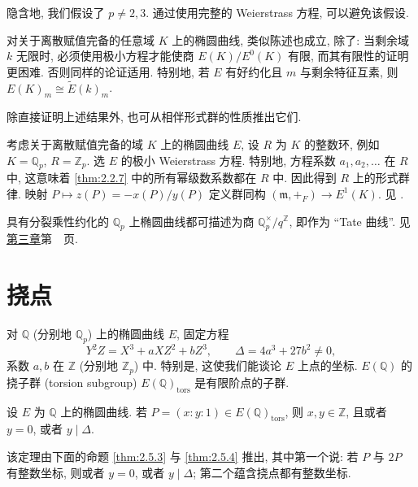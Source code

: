 \begin{remark} \label{thm:2.4.3} 
隐含地, 我们假设了 $p\neq 2,3$. 通过使用完整的 Weierstrass 方程, 可以避免该假设.

对关于离散赋值完备的任意域 $K$ 上的椭圆曲线, 类似陈述也成立, 除了: 当剩余域 $k$ 无限时, 必须使用极小方程才能使商 $E(K)/E^0(K)$ 有限, 而其有限性的证明更困难. 否则同样的论证适用. 特别地, 若 $E$ 有好约化且 $m$ 与剩余特征互素, 则 $E(K)_m\cong\tilde{E}(k)_m$.
\end{remark}

\begin{aside} \label{thm:2.4.4} 
除直接证明上述结果外, 也可从相伴形式群的性质推出它们.

考虑关于离散赋值完备的域 $K$ 上的椭圆曲线 $E$, 设 $R$ 为 $K$ 的整数环, 例如 $K = \mathbb{Q}_p$, $R = \mathbb{Z}_p$. 选 $E$ 的极小 Weierstrass 方程. 特别地, 方程系数 $a_1, a_2, \dots$ 在 $R$ 中, 这意味着 \ref{thm:2.2.7} 中的所有幂级数系数都在 $R$ 中. 因此得到 $R$ 上的形式群律. 映射 $P\mapsto z(P) = -x(P)/y(P)$ 定义群同构 $(\mathfrak{m}, +_F)\to E^1(K)$. 见 \cite[\S6]{tate1974}.
\end{aside}

\begin{aside} \label{thm:2.4.5} 
具有分裂乘性约化的 $\mathbb{Q}_p$ 上椭圆曲线都可描述为商 $\mathbb{Q}_p^{\times}/q^{\mathbb{Z}}$, 即作为 ``Tate 曲线''. 见\hyperref[ch:3]{第三章}第~\pageref{subsec:tate-curves}~页.
\end{aside}

\section{挠点}\label{sec:2.5}

对 $\mathbb{Q}$ (分别地 $\mathbb{Q}_p$) 上的椭圆曲线 $E$, 固定方程
\[
Y^2Z = X^3 + aXZ^2 + bZ^3, \qquad \Delta = 4a^3 + 27b^2\neq 0,
\]
系数 $a,b$ 在 $\mathbb{Z}$ (分别地 $\mathbb{Z}_p$) 中. 特别是, 这使我们能谈论 $E$ 上点的坐标. $E(\mathbb{Q})$ 的挠子群 (torsion subgroup) $E(\mathbb{Q})_{\mathrm{tors}}$ 是有限阶点的子群.

\begin{theorem} \label{thm:2.5.1} 
设 $E$ 为 $\mathbb{Q}$ 上的椭圆曲线. 若 $P = (x:y:1)\in E(\mathbb{Q})_{\mathrm{tors}}$, 则 $x, y\in\mathbb{Z}$, 且或者 $y = 0$, 或者 $y\mid\Delta$.
\end{theorem}

该定理由下面的命题 \ref{thm:2.5.3} 与 \ref{thm:2.5.4} 推出, 其中第一个说: 若 $P$ 与 $2P$ 有整数坐标, 则或者 $y = 0$, 或者 $y\mid\Delta$; 第二个蕴含挠点都有整数坐标.

